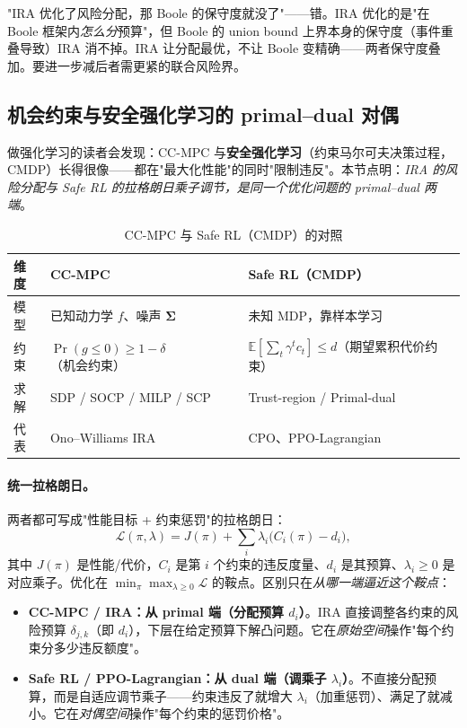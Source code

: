 \begin{pitfall}
"IRA 优化了风险分配，那 Boole 的保守度就没了"——错。IRA 优化的是"在 Boole 框架内\emph{怎么分}预算"，但 Boole 的 union bound 上界本身的保守度（事件重叠导致）IRA 消不掉。IRA 让分配最优，不让 Boole 变精确——两者保守度叠加。要进一步减后者需更紧的联合风险界。
\end{pitfall}

\subsection{机会约束与安全强化学习的 primal--dual 对偶}
\label{sec:cc-saferl}

做强化学习的读者会发现：CC-MPC 与\textbf{安全强化学习}（约束马尔可夫决策过程，CMDP）长得很像——都在"最大化性能"的同时"限制违反"。本节点明：\emph{IRA 的风险分配与 Safe RL 的拉格朗日乘子调节，是同一个优化问题的 primal--dual 两端}。

\begin{table}[H]\centering\small
\caption{CC-MPC 与 Safe RL（CMDP）的对照}
\label{tab:cc-saferl}
\begin{tabular}{lll}
\toprule
维度 & CC-MPC & Safe RL（CMDP）\\
\midrule
模型 & 已知动力学 $f$、噪声 $\boldsymbol{\Sigma}$ & 未知 MDP，靠样本学习 \\
约束 & $\Pr(g\le0)\ge1-\delta$（机会约束）& $\mathbb{E}[\sum_t\gamma^t c_t]\le d$（期望累积代价约束）\\
求解 & SDP / SOCP / MILP / SCP & Trust-region / Primal-dual \\
代表 & Ono--Williams IRA\cite{ono2008iterative} & CPO\cite{achiam2017constrained}、PPO-Lagrangian \\
\bottomrule
\end{tabular}
\end{table}

\paragraph{统一拉格朗日。}
两者都可写成"性能目标 + 约束惩罚"的拉格朗日：
\begin{equation}
  \mathcal{L}(\pi,\lambda)=J(\pi)+\sum_i\lambda_i\big(C_i(\pi)-d_i\big),
  \label{eq:cc-lagrangian}
\end{equation}
其中 $J(\pi)$ 是性能/代价，$C_i$ 是第 $i$ 个约束的违反度量、$d_i$ 是其预算、$\lambda_i\ge0$ 是对应乘子。优化在 $\min_\pi\max_{\lambda\ge0}\mathcal{L}$ 的鞍点。区别只在\emph{从哪一端逼近这个鞍点}：
\begin{itemize}
  \item \textbf{CC-MPC / IRA：从 primal 端（分配预算 $d_i$）}。IRA 直接调整各约束的风险预算 $\delta_{j,k}$（即 $d_i$），下层在给定预算下解凸问题。它在\emph{原始空间}操作"每个约束分多少违反额度"。
  \item \textbf{Safe RL / PPO-Lagrangian：从 dual 端（调乘子 $\lambda_i$）}。不直接分配预算，而是自适应调节乘子——约束违反了就增大 $\lambda_i$（加重惩罚）、满足了就减小。它在\emph{对偶空间}操作"每个约束的惩罚价格"。
\end{itemize}

